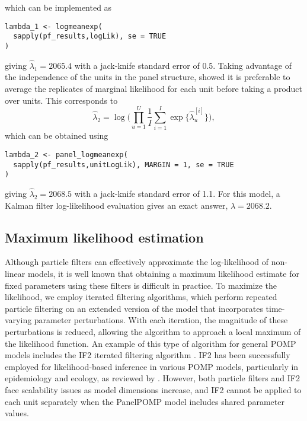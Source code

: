 \noindent which can be implemented as

\begin{verbatim}
lambda_1 <- logmeanexp(
  sapply(pf_results,logLik), se = TRUE
)
\end{verbatim}

\noindent giving \(\hat{\lambda}_1=2065.4\) with a jack-knife standard error of 0.5.
Taking advantage of the independence of the units in the panel structure, \citet{breto20} showed it is preferable to average the replicates of marginal likelihood for each unit before taking a product over units.
This corresponds to
\[
\hat{\lambda}_2 = \log \Big(\prod_{u=1}^U \frac{1}{I}\sum_{i=1}^{I}  \exp \big\{ \hat{\lambda}^{[i]}_{u} \big\}\Big),
\]
which can be obtained using

\begin{verbatim}
lambda_2 <- panel_logmeanexp(
  sapply(pf_results,unitLogLik), MARGIN = 1, se = TRUE
)
\end{verbatim}

\noindent giving \(\hat{\lambda}_2=2068.5\) with a jack-knife standard error of 1.1.
For this model, a Kalman filter log-likelihood evaluation gives an exact answer, \(\lambda=2068.2\).

\subsection{Maximum likelihood estimation}\label{maximum-likelihood-estimation}

Although particle filters can effectively approximate the log-likelihood of non-linear models, it is well known that obtaining a maximum likelihood estimate for fixed parameters using these filters is difficult in practice.
To maximize the likelihood, we employ iterated filtering algorithms, which perform repeated particle filtering on an extended version of the model that incorporates time-varying parameter perturbations.
With each iteration, the magnitude of these perturbations is reduced, allowing the algorithm to approach a local maximum of the likelihood function.
An example of this type of algorithm for general POMP models includes the IF2 iterated filtering algorithm \citep{ionides15}.
IF2 has been successfully employed for likelihood-based inference in various POMP models, particularly in epidemiology and ecology, as reviewed by \citet{breto18}.
However, both particle filters and IF2 face scalability issues as model dimensions increase, and IF2 cannot be applied to each unit separately when the PanelPOMP model includes shared parameter values.

